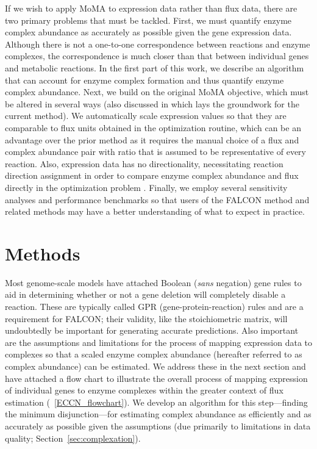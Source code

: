 If we wish to apply MoMA to expression data rather than flux data, there
are two primary problems that must be tackled. First, we must quantify
enzyme complex abundance as accurately as possible given the gene expression
data. Although there is not a one-to-one correspondence between
reactions and enzyme complexes, the correspondence is much closer
than that between individual genes and metabolic reactions. In the
first part of this work, we describe an algorithm that can account for
enzyme complex formation and thus quantify enzyme complex
abundance. Next, we build on the original MoMA objective, which must
be altered in several ways (also discussed in \citealt{Lee2012} which
lays the groundwork for the current method). We automatically scale
expression values so that they are comparable to flux units obtained
in the optimization routine, which can be an advantage over the prior
method as it requires the manual choice of a flux and complex abundance pair
with ratio that is assumed to be representative of every reaction. 
Also, expression data has no directionality, necessitating
reaction direction assignment in order to compare enzyme complex
abundance and flux directly in the optimization problem
\citep{Lee2012}.  Finally, we employ several sensitivity analyses and
performance benchmarks so that users of the FALCON method and related
methods may have a better understanding of what to expect in practice.

\section{Methods}

Most genome-scale models have attached Boolean (\textit{sans}
negation) gene rules to aid in determining whether or not a gene
deletion will
completely disable a reaction. These are typically called GPR
(gene-protein-reaction) rules and are a requirement for FALCON; their
validity, like the stoichiometric matrix, will undoubtedly be
important for generating accurate predictions. Also important are the
assumptions and limitations for the process of mapping expression data
to complexes so that a scaled enzyme complex abundance (hereafter
referred to as complex abundance) can be estimated. We address these
in the next section and have attached a flow chart to illustrate the
overall process of mapping expression of individual genes to enzyme
complexes within the greater context of flux estimation 
(\Fig~\ref{ECCN_flowchart}). We develop an algorithm for
this step---finding the minimum disjunction---for estimating complex
abundance as efficiently and as accurately as possible given the
assumptions (due primarily to limitations in data quality; \suppOrApp
Section~\ref{sec:complexation}).

